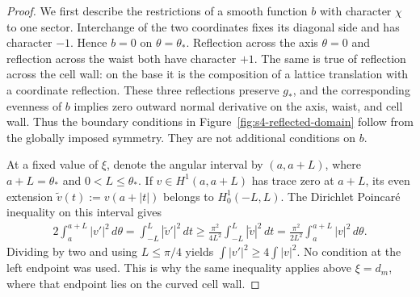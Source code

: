 \documentclass[a4paper,11pt,oneside,reqno]{amsart}
\numberwithin{equation}{section}
\theoremstyle{definition}
\begin{document}
\begin{proof}
    We first describe the restrictions of a smooth function
    $b$ with character $\chi$ to one sector. Interchange of
    the two coordinates fixes its diagonal side and has
    character $-1$. Hence $b=0$ on $\theta=\theta_*$.
    Reflection across the axis $\theta=0$ and reflection
    across the waist both have character $+1$. The same
    is true of reflection across the cell wall: on the
    base it is the composition of a lattice translation
    with a coordinate reflection. These three reflections
    preserve $g_*$, and the corresponding evenness of
    $b$ implies zero outward normal derivative on the
    axis, waist, and cell wall. Thus the boundary
    conditions in Figure~\ref{fig:s4-reflected-domain}
    follow from the globally imposed symmetry. They are
    not additional conditions on $b$.

    At a fixed value of $\xi$, denote the angular interval
    by $(a,a+L)$, where $a+L=\theta_*$ and
    $0<L\leq\theta_*$. If $v\in H^1(a,a+L)$ has
    trace zero at $a+L$, its even extension
    $\widetilde v(t):=v(a+|t|)$ belongs to
    $H^1_0(-L,L)$. The Dirichlet Poincar\'e inequality
    on this interval gives
    \begin{align*}
        2\int_a^{a+L}|v'|^2\,d\theta
        =\int_{-L}^L|\widetilde v'|^2\,dt\geq\frac{\pi^2}{4L^2}
          \int_{-L}^L|\widetilde v|^2\,dt
        =\frac{\pi^2}{2L^2}
          \int_a^{a+L}|v|^2\,d\theta.
    \end{align*}
    Dividing by two and using $L\leq\pi/4$ yields
    $\int|v'|^2\geq4\int|v|^2$.
    No condition at the left endpoint was used. This
    is why the same inequality applies above $\xi=d_m$,
    where that endpoint lies on the curved cell wall.


\end{proof}
\end{document}
